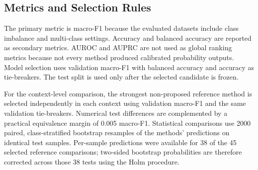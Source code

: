 \documentclass[main.tex]{subfiles}
\begin{document}
\subsection{Metrics and Selection Rules}

The primary metric is macro-F1 because the evaluated datasets include class imbalance and multi-class settings. Accuracy and balanced accuracy are reported as secondary metrics. AUROC and AUPRC are not used as global ranking metrics because not every method produced calibrated probability outputs. Model selection uses validation macro-F1 with balanced accuracy and accuracy as tie-breakers. The test split is used only after the selected candidate is frozen.

For the context-level comparison, the strongest non-proposed reference method is selected independently in each context using validation macro-F1 and the same validation tie-breakers. Numerical test differences are complemented by a practical equivalence margin of 0.005 macro-F1. Statistical comparisons use 2000 paired, class-stratified bootstrap resamples of the methods' predictions on identical test samples. Per-sample predictions were available for 38 of the 45 selected reference comparisons; two-sided bootstrap probabilities are therefore corrected across those 38 tests using the Holm procedure.
\end{document}
